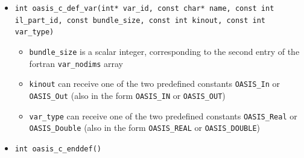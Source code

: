 \begin{itemize}
\vspace{0.2cm}
\item {\tt int oasis\_c\_def\_var(int* var\_id, const char* name, const int il\_part\_id, const bundle\_size, const int kinout, const int var\_type)}
  \begin{itemize}
  \item {\tt bundle\_size} is a scalar integer, corresponding to the
    second entry of the fortran {\tt var\_nodims} array
  \item {\tt kinout} can receive one of the two predefined constants
    {\tt OASIS\_In} or {\tt OASIS\_Out} (also in the form
    {\tt OASIS\_IN} or {\tt OASIS\_OUT})
  \item {\tt var\_type} can receive one of the two predefined constants
    {\tt OASIS\_Real} or {\tt OASIS\_Double} (also in the form
    {\tt OASIS\_REAL} or {\tt OASIS\_DOUBLE})
  \end{itemize}

\vspace{0.2cm}
\item {\tt int oasis\_c\_enddef()}


\end{itemize}
